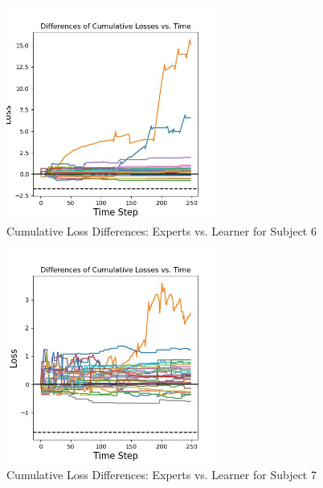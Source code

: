 \begin{figure}[ht]
    \centering
    \includegraphics[width=0.625\textwidth]{images/RM_differences.jpg}
    \caption{Cumulative Loss Differences: Experts vs. Learner for Subject 6}
\end{figure}
\begin{figure}[h!]
    \centering
    \includegraphics[width=0.625\textwidth]{images/RY_differences.jpg}
    \caption{Cumulative Loss Differences: Experts vs. Learner for Subject 7}
\end{figure}